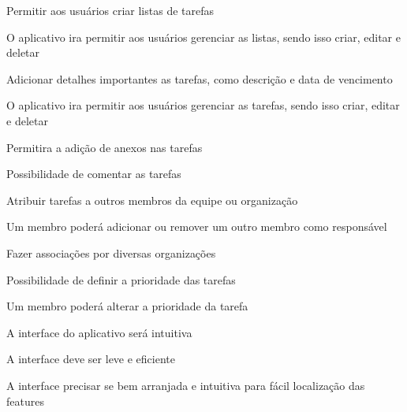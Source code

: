 \begin{enumalfa}[label=\arabic*.]{1}
    \item Permitir aos usuários criar listas de tarefas
    \subitem \begin{enumalfa}[leftmargin=0pt, topsep=0pt]{0.8}
        \item O aplicativo ira permitir aos usuários gerenciar as listas, sendo isso criar, editar e deletar
    \end{enumalfa}
    \item Adicionar detalhes importantes as tarefas, como descrição e data de vencimento
    \subitem \begin{enumalfa}[leftmargin=0pt, topsep=0pt]{0.8}
        \item O aplicativo ira permitir aos usuários gerenciar as tarefas, sendo isso criar, editar e deletar
        \item Permitira a adição de anexos nas tarefas
        \item Possibilidade de comentar as tarefas
    \end{enumalfa}
    \item Atribuir tarefas a outros membros da equipe ou organização
    \subitem \begin{enumalfa}[leftmargin=0pt, topsep=0pt]{0.8}
        \item Um membro poderá adicionar ou remover um outro membro como responsável
        \item Fazer associações por diversas organizações
    \end{enumalfa}
    \item Possibilidade de definir a prioridade das tarefas
    \subitem \begin{enumalfa}[leftmargin=0pt, topsep=0pt]{0.8}
        \item Um membro poderá alterar a prioridade da tarefa
    \end{enumalfa}
    \item A interface do aplicativo será intuitiva
    \subitem \begin{enumalfa}[leftmargin=0pt, topsep=0pt]{0.8}
        \item A interface deve ser leve e eficiente
        \item A interface precisar se bem arranjada e intuitiva para fácil localização das features 
    \end{enumalfa}
\end{enumalfa}
